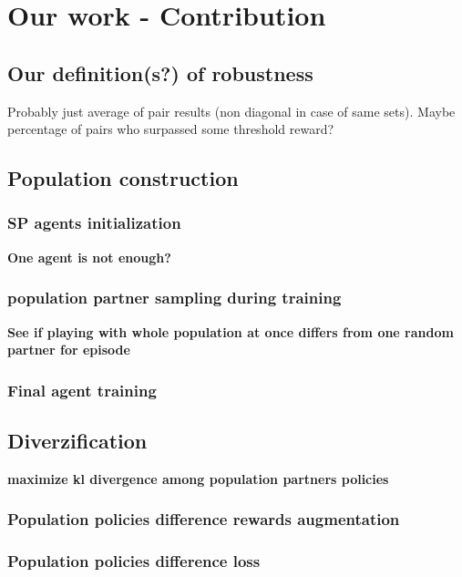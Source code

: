 \chapter{Our work - Contribution}

\section{Our definition(s?) of robustness}
Probably just average of pair results (non diagonal in case of same sets).
Maybe percentage of pairs who surpassed some threshold reward?

\section{Population construction}

\subsection{SP agents initialization}
\textbf{One agent is not enough?}

\subsection{population partner sampling during training}
\textbf{See if playing with whole population at once differs from one random partner for episode}

\subsection{Final agent training}

\section{Diverzification}
\textbf{maximize kl divergence among population partners policies}

\subsection{Population policies difference rewards augmentation}

\subsection{Population policies difference loss}
